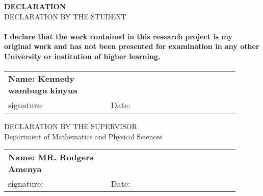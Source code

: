 \begin{titlepage}
\Large \textbf{DECLARATION}\\[0.5cm]
\center 
\large DECLARATION BY THE STUDENT\\
\paragraph{I declare that the work contained in this research project is my original work
and has not been presented for examination in any other University or
institution of higher learning.}

\begin{tabular}{p{0.4\linewidth}p{0.5\linewidth}}
  \textbf{Name: Kennedy wambugu kinyua} \\
  \vspace{12pt}
  signature: \dotfill & \vspace{12pt}  Date: \dotfill \\
\end{tabular}
\smallskip
\large DECLARATION BY THE SUPERVISOR\\
Department of Mathematics and Physical Sciences \\
\begin{tabular}{p{0.4\linewidth}p{0.5\linewidth}}
  \textbf{Name: MR. Rodgers  Amenya} \\
  \vspace{12pt}
  signature: \dotfill & \vspace{12pt}  Date: \dotfill \\
\end{tabular}
\end{titlepage}
